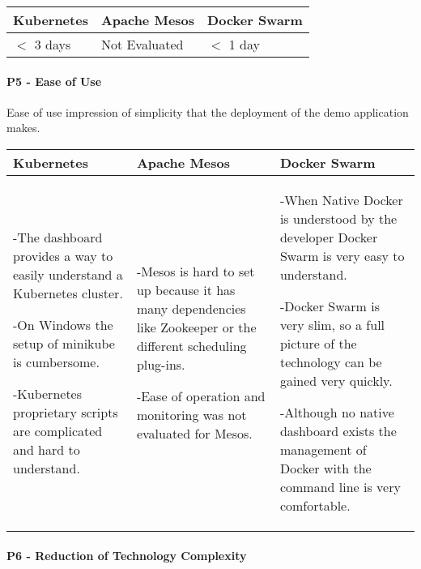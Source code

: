 \begin{center}
  \begin{tabular}{ | p{4.5cm} | p{4.5cm} | p{4.5cm} | }
    \hline
    \textbf{Kubernetes}&\textbf{Apache Mesos}&\textbf{Docker Swarm}\\\hline
    $<$ 3 days & Not Evaluated & $<$ 1 day \\
    \hline
  \end{tabular}
\end{center}

\newpage
\paragraph{P5 - Ease of Use}

Ease of use impression of simplicity that the deployment of the demo application
makes.

\begin{center}
  \begin{tabular}{ | p{4.5cm} | p{4.5cm} | p{4.5cm} | }
    \hline
    \textbf{Kubernetes}&\textbf{Apache Mesos}&\textbf{Docker Swarm}\\\hline
    -The dashboard provides a way to easily understand a Kubernetes
    cluster.
    
    -On Windows the setup of minikube is cumbersome.
    
    -Kubernetes proprietary scripts are complicated and hard to understand. &
    
    -Mesos is hard to set up because it has many dependencies like Zookeeper
    or the different scheduling plug-ins.
    
    -Ease of operation and monitoring was not evaluated for Mesos. & 
    
    -When Native Docker is understood by the developer Docker Swarm is very
    easy to understand.
    
    -Docker Swarm is very slim, so a full picture of the technology can be
    gained very quickly.
    
    -Although no native dashboard exists the management of Docker with the
    command line is very comfortable.\\
    \hline
  \end{tabular}
\end{center}

\paragraph{P6 - Reduction of Technology Complexity}

